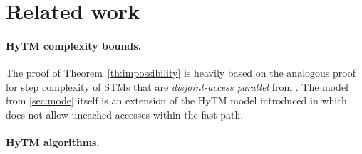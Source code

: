 \section{Related work}
\label{sec:rel}
%
\paragraph{HyTM complexity bounds.}
The proof of Theorem~\ref{th:impossibility} is heavily based on the analogous proof for step complexity of
STMs that are \emph{disjoint-access parallel} from \cite{prog15-pact}.
The model from \cref{sec:mode} itself is an extension of the HyTM model introduced in \cite{hytm14disc}
which does not allow uncached accesses within the fast-path.

\paragraph{HyTM algorithms.}

